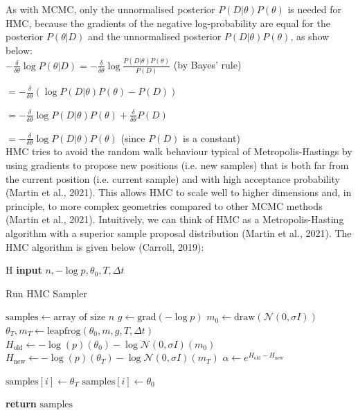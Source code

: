 \documentclass[conference]{IEEEtran}
\begin{document}
As with MCMC, only the unnormalised posterior $P(D|\theta)P(\theta)$ is needed for HMC, because the gradients of the negative log-probability are equal for the posterior $P(\theta|D)$ and the unnormalised posterior $P(D|\theta)P(\theta)$, as show below:\\

$\displaystyle - \frac{\delta}{\delta \theta} \log P(\theta|D) = - \frac{\delta}{\delta \theta} \log \frac{P(D|\theta)P(\theta)}{P(D)}$ (by Bayes' rule)

$\displaystyle = - \frac{\delta}{\delta \theta} (\log P(D|\theta) P(\theta) - P(D))$

$\displaystyle = - \frac{\delta}{\delta \theta} \log P(D|\theta) P(\theta) + \frac{\delta}{\delta \theta} P(D)$

$\displaystyle = - \frac{\delta}{\delta \theta} \log P(D|\theta) P(\theta)$ (since $P(D)$ is a constant)\\

HMC tries to avoid the random walk behaviour typical of Metropolis-Hastings by using gradients to propose new positions (i.e. new samples) that is both far from the current position (i.e. current sample) and with high acceptance probability (Martin et al., 2021). This allows HMC to scale well to higher dimensions and, in principle, to more complex geometries compared to other MCMC methods (Martin et al., 2021). Intuitively, we can think of HMC as a Metropolis-Hasting algorithm with a superior sample proposal distribution (Martin et al., 2021). The HMC algorithm is given below (Carroll, 2019):\\

\begin{algorithm}{H}
\textbf{input} $n, -\log p, \theta_0, T, \Delta t$
\caption{Run HMC Sampler}
\begin{algorithmic}[H]
\State $\text{samples} \gets \text{array of size } n$
\State $g \gets \text{grad}(-\log p)$
    \State $m_0 \gets \text{draw}(\mathcal{N}(0, \sigma I))$
    \State $\theta_T, m_T \gets \text{leapfrog}(\theta_0, m, g, T, \Delta t)$
    \State $H_\text{old} \gets -\log(p)(\theta_0) - \log \mathcal{N}(0, \sigma I)(m_0)$
    \State $H_\text{new} \gets -\log(p)(\theta_T) - \log \mathcal{N}(0, \sigma I)(m_T)$
    \State $\alpha \gets e^{H_\text{old} - H_\text{new}}$
    
        \State $\text{samples}[i] \gets \theta_T$
    \Else
        \State $\text{samples}[i] \gets \theta_0$
    \EndIf
\EndFor
\end{algorithmic}
\textbf{return} $\text{samples}$
\end{algorithm}
\end{document}
